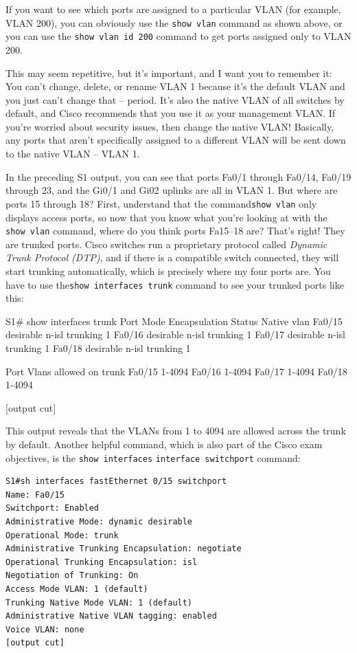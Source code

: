 If you want to see which ports are assigned to a particular VLAN (for
example, VLAN 200), you can obviously use the \texttt{show\ vlan}
command as shown above, or you can use the \texttt{show\ vlan\ id\ 200}
command to get ports assigned only to VLAN 200.

This may seem repetitive, but it's important, and I want you to remember
it: You can't change, delete, or rename VLAN 1 because it's the default
VLAN and you just can't change that -- period. It's also the native VLAN
of all switches by default, and Cisco recommends that you use it as your
management VLAN. If you're worried about security issues, then change
the native VLAN! Basically, any ports that aren't specifically assigned
to a different VLAN will be sent down to the native VLAN -- VLAN 1.

In the preceding S1 output, you can see that ports Fa0/1 through Fa0/14,
Fa0/19 through 23, and the Gi0/1 and Gi02 uplinks are all in VLAN 1. But
where are ports 15 through 18? First, understand that the
command\texttt{show\ vlan} only displays access ports, so now that you
know what you're looking at with the \texttt{show\ vlan} command, where
do you think ports Fa15--18 are? That's right! They are trunked ports.
Cisco switches run a proprietary protocol called \emph{Dynamic Trunk
Protocol (DTP)}, and if there is a compatible switch connected, they
will start trunking automatically, which is precisely where my four
ports are. You have to use the\texttt{show\ interfaces\ trunk} command
to see your trunked ports like this:

\begin{cli}
S1# show interfaces trunk
Port        Mode             Encapsulation  Status        Native vlan
Fa0/15      desirable        n-isl          trunking      1
Fa0/16      desirable        n-isl          trunking      1
Fa0/17      desirable        n-isl          trunking      1
Fa0/18      desirable        n-isl          trunking      1
 
Port        Vlans allowed on trunk
Fa0/15      1-4094
Fa0/16      1-4094
Fa0/17      1-4094
Fa0/18      1-4094
 
[output cut]
\end{cli}

This output reveals that the VLANs from 1 to 4094 are allowed across the trunk by default.
Another helpful command, which is also part of the Cisco exam
objectives, is the \texttt{show\ interfaces}
\texttt{interface}\texttt{\ switchport} command:

\begin{verbatim}
S1#sh interfaces fastEthernet 0/15 switchport
Name: Fa0/15
Switchport: Enabled
Administrative Mode: dynamic desirable
Operational Mode: trunk
Administrative Trunking Encapsulation: negotiate
Operational Trunking Encapsulation: isl
Negotiation of Trunking: On
Access Mode VLAN: 1 (default)
Trunking Native Mode VLAN: 1 (default)
Administrative Native VLAN tagging: enabled
Voice VLAN: none
[output cut]
\end{verbatim}

